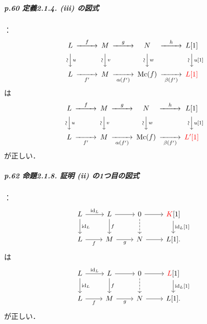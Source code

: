 \subparagraph{p.60 定義2.1.4. (iii) の図式}：
    \[\begin{CD}
    L@>{f}>>M@>{g}>>N@>{h}>>L[1]\\
    @V{{\text{\rotatebox{-90}{\(\sim\)}}}}V{u}V@V{{\text{\rotatebox{-90}{\(\sim\)}}}}V{v}V@V{{\text{\rotatebox{-90}{\(\sim\)}}}}V{w}V@V{{\text{\rotatebox{-90}{\(\sim\)}}}}V{u[1]}V\\
    L@>>{f'}>M@>>{\alpha(f')}>\mathrm{Mc}(f)@>>{\beta(f')}>\textcolor{red}{L[1]}
    \end{CD}\]
は 
\[\begin{CD}
    L@>{f}>>M@>{g}>>N@>{h}>>L[1]\\
    @V{{\text{\rotatebox{-90}{\(\sim\)}}}}V{u}V@V{{\text{\rotatebox{-90}{\(\sim\)}}}}V{v}V@V{{\text{\rotatebox{-90}{\(\sim\)}}}}V{w}V@V{{\text{\rotatebox{-90}{\(\sim\)}}}}V{u[1]}V\\
    L@>>{f'}>M@>>{\alpha(f')}>\mathrm{Mc}(f)@>>{\beta(f')}>\textcolor{red}{L'[1]}
    \end{CD}\]
が正しい．
\clearpage
\subparagraph{p.62 命題2.1.8. 証明 (ii) の1つ目の図式}：
\[\begin{tikzcd}
    L
    \arrow[r,"{\id_L}"]
    \arrow[d,"{\id_L}"]
    &
    L
    \arrow[d,"f"]
    \arrow[r] 
    & 
    0
    \arrow[r] 
    \arrow[d,dashed]
    &
    \textcolor{red}{K}[1]
    \arrow[d,"{\id_L[1]}"]
    \\ 
    L\arrow[r,"f"']
    &
    M\arrow[r,"g"'] 
    & 
    N\arrow[r] 
    &
    {L}[1]. 
\end{tikzcd}\]
は 
\[\begin{tikzcd}
    L
    \arrow[r,"{\id_L}"]
    \arrow[d,"{\id_L}"]
    &
    L
    \arrow[d,"f"]
    \arrow[r] 
    & 
    0
    \arrow[r] 
    \arrow[d,dashed]
    &
    \textcolor{red}{L}[1]
    \arrow[d,"{\id_L[1]}"]
    \\ 
    L\arrow[r,"f"']
    &
    M\arrow[r,"g"'] 
    & 
    N\arrow[r] 
    &
    {L}[1]. 
\end{tikzcd}\]
が正しい．

